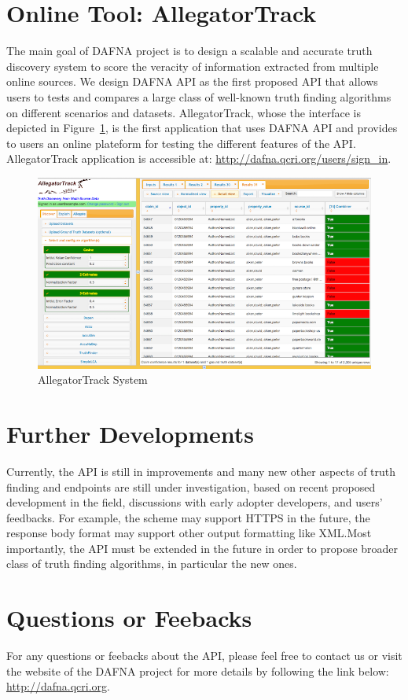 \documentclass[a4paper,10pt]{scrartcl}
\begin{document}
\section{Online Tool: AllegatorTrack}
The main goal of DAFNA project is to design a scalable and accurate truth discovery system to score the veracity of information extracted from multiple 
online sources.  We design DAFNA API as the first proposed API that allows users to tests and compares a large class of well-known truth finding algorithms
on different scenarios and datasets. AllegatorTrack, whose the interface is depicted in Figure~\ref{allegatortrack}, is the first application that uses DAFNA API and provides to users
an online plateform for testing the different features of the API. AllegatorTrack application is accessible at: \href{http://dafna.qcri.org/users/sign\_in}{\small{http://dafna.qcri.org/users/sign\_in}}.

\begin{figure}[!ht]
\centering
\includegraphics[scale=0.45]{snapshot} 
\caption{AllegatorTrack System}\label{allegatortrack}
\end{figure}

\section{Further Developments}
Currently, the API is still in improvements and many new other aspects of truth finding and endpoints are still under investigation, based on recent
proposed development in the field, discussions with early adopter developers, and users' feedbacks. For example, the scheme may support HTTPS in the 
future, the response body format may support other output formatting like XML.Most importantly, the API must be extended in the future in order to propose
broader class of truth finding algorithms, in particular the new ones.

\section{Questions or Feebacks}
For any questions or feebacks about the API, please feel free to contact us %
or visit the website of the DAFNA project for more details by following the link below:
\href{http://dafna.qcri.org}{\small{http://dafna.qcri.org}}.
\end{document}
